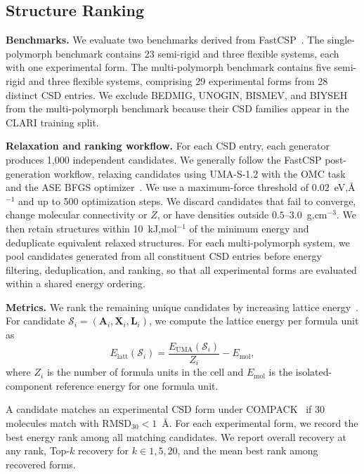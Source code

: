 \subsection{Structure Ranking}
\label{sec:structure-ranking}

\textbf{Benchmarks.}
We evaluate two benchmarks derived from FastCSP~\citep{gharakhanyan2025fastcsp}. The single-polymorph benchmark contains 23 semi-rigid and three flexible systems, each with one experimental form. The multi-polymorph benchmark contains five semi-rigid and three flexible systems, comprising 29 experimental forms from 28 distinct CSD entries. We exclude BEDMIG, UNOGIN, BISMEV, and BIYSEH from the multi-polymorph benchmark because their CSD families appear in the CLARI training split.

\textbf{Relaxation and ranking workflow.} 
For each CSD entry, each generator produces 1{,}000 independent candidates. We generally follow the FastCSP post-generation workflow, relaxing candidates using UMA-S-1.2 with the OMC task~\citep{wood2025family} and the ASE BFGS optimizer~\citep{larsen2017atomic}. We use a maximum-force threshold of $0.02$~eV,\AA$^{-1}$ and up to 500 optimization steps. We discard candidates that fail to converge, change molecular connectivity or $Z$, or have densities outside $0.5$--$3.0$~g,cm$^{-3}$. We then retain structures within 10~kJ,mol$^{-1}$ of the minimum energy and deduplicate equivalent relaxed structures. For each multi-polymorph system, we pool candidates generated from all constituent CSD entries before energy filtering, deduplication, and ranking, so that all experimental forms are evaluated within a shared energy ordering.

\textbf{Metrics.}
We rank the remaining unique candidates by increasing lattice
energy~\citep{gharakhanyan2025fastcsp}. For candidate
$\mathcal{S}_i=(\mathbf{A}_i,\mathbf{X}_i,\mathbf{L}_i)$, we compute the
lattice energy per formula unit as
\begin{equation}
  E_{\mathrm{latt}}(\mathcal{S}_i)
  = \frac{E_{\mathrm{UMA}}(\mathcal{S}_i)}{Z_i}
  - E_{\mathrm{mol}},
\end{equation}
where $Z_i$ is the number of formula units in the cell and $E_{\mathrm{mol}}$
is the isolated-component reference energy for one formula unit.

A candidate matches an experimental CSD form under
COMPACK~\citep{chisholm2005compack} if 30 molecules match with
$\mathrm{RMSD}_{30}<1$~\AA. For each experimental form, we record the best
energy rank among all matching candidates. We report overall recovery at any rank, Top-$k$ recovery for $k\in{1,5,20}$, and the mean best rank among recovered forms.

